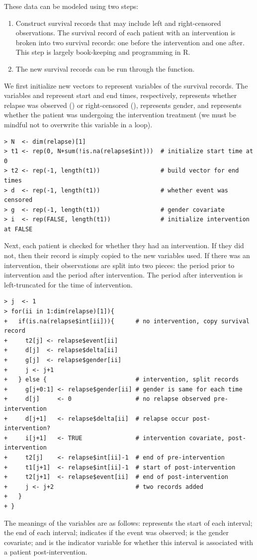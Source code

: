 \documentclass[11pt]{article}
\newcommand{\R}[1]{\textsf{R}}
\begin{document}
These data can be modeled using two steps:
\begin{enumerate}
\item Construct survival records that may include left and right-censored observations. The survival record of each patient with an intervention is broken into two survival records: one before the intervention and one after. This step is largely book-keeping and programming in \R{}.
\item The new survival records can be run through the  function.
\end{enumerate}
We first initialize new vectors to represent variables of the survival records. The variables  and  represent start and end times, respectively,  represents whether relapse was observed () or right-censored (),  represents gender, and  represents whether the patient was undergoing the intervention treatment (we must be mindful not to overwrite this variable in a loop).
{\color{verbatimrcom}\begin{verbatim}
> N  <- dim(relapse)[1]
> t1 <- rep(0, N+sum(!is.na(relapse$int)))  # initialize start time at 0
> t2 <- rep(-1, length(t1))                 # build vector for end times
> d  <- rep(-1, length(t1))                 # whether event was censored
> g  <- rep(-1, length(t1))                 # gender covariate
> i  <- rep(FALSE, length(t1))              # initialize intervention at FALSE
\end{verbatim}}
Next, each patient is checked for whether they had an intervention. If they did not, then their record is simply copied to the new variables used. If there was an intervention, their observations are split into two pieces: the period prior to intervention and the period after intervention. The period after intervention is left-truncated for the time of intervention.
{\color{verbatimrcom}\begin{verbatim}
> j  <- 1
> for(ii in 1:dim(relapse)[1]){
+   if(is.na(relapse$int[ii])){      # no intervention, copy survival record
+     t2[j] <- relapse$event[ii]
+     d[j]  <- relapse$delta[ii]
+     g[j]  <- relapse$gender[ii]
+     j <- j+1
+   } else {                         # intervention, split records
+     g[j+0:1] <- relapse$gender[ii] # gender is same for each time
+     d[j]     <- 0                  # no relapse observed pre-intervention
+     d[j+1]   <- relapse$delta[ii]  # relapse occur post-intervention?
+     i[j+1]   <- TRUE               # intervention covariate, post-intervention
+     t2[j]    <- relapse$int[ii]-1  # end of pre-intervention
+     t1[j+1]  <- relapse$int[ii]-1  # start of post-intervention
+     t2[j+1]  <- relapse$event[ii]  # end of post-intervention
+     j <- j+2                       # two records added
+   }
+ }
\end{verbatim}}
The meanings of the variables are as follows:  represents the start of each interval;  the end of each interval;  indicates if the event was observed;  is the gender covariate; and  is the indicator variable for whether this interval is associated with a patient post-intervention.
\end{document}
